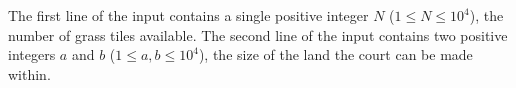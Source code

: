 

The first line of the input contains a single positive
integer $N$ ($1 \leq N \leq 10^4$), the number of grass tiles
available. The second line of the input contains
two positive integers $a$ and $b$ ($1 \leq a, b \leq 10^4$),
the size of the land the court can be made within.

